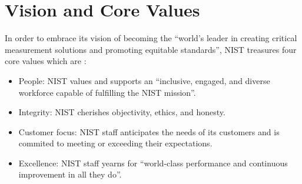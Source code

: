\section{Vision and Core Values}

In order to embrace its vision of becoming the ``world's leader in creating critical measurement solutions and promoting equitable standards'', NIST treasures four core values which are \cite{nist2016mission}:

\begin{itemize}
    \item People: NIST values and supports an ``inclusive, engaged, and diverse workforce capable of fulfilling the NIST mission''.
    \item Integrity: NIST cherishes objectivity, ethics, and honesty.
    \item Customer focus: NIST staff anticipates the needs of its customers and is commited to meeting or exceeding their expectations.
    \item Excellence: NIST staff yearns for ``world-class performance and continuous improvement in all they do''.
\end{itemize}